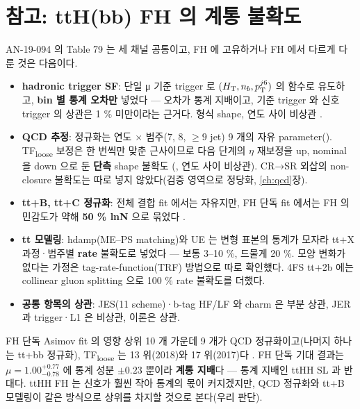 \section{참고: ttH(bb) FH 의 계통 불확도}\label{sec:syst-tth}

AN-19-094 의 Table 79 는 세 채널 공통이고, FH 에 고유하거나 FH 에서 다르게 다룬 것은 다음이다.
\begin{itemize}
\item \textbf{hadronic trigger SF}: 단일 μ 기준 trigger 로 $(H_{\mathrm{T}}, n_b, p_{\mathrm{T}}^{j6})$ 의 함수로 유도하고, \textbf{bin 별 통계 오차만} 넣었다 —
  오차가 통계 지배이고, 기준 trigger 와 신호 trigger 의 상관은 1 \% 미만이라는 근거다. 형식 shape, 연도 사이 비상관
  .
\item \textbf{QCD 추정}: 정규화는 연도 × 범주(7, 8, $\ge9$ jet) 9 개의 자유 parameter().
  TF\textsubscript{loose} 보정은 한 번씩만 맞춘 근사이므로 다음 단계의 $\eta$ 재보정을 up, nominal 을 down 으로 둔 \textbf{단측} shape 불확도
  (, 연도 사이 비상관). CR→SR 외삽의 non-closure
  불확도는 따로 넣지 않았다(검증 영역으로 정당화, \ref{ch:qcd}장).
\item \textbf{tt+B, tt+C 정규화}: 전체 결합 fit 에서는 자유지만, FH 단독 fit 에서는 FH 의 민감도가 약해 \textbf{50 \% lnN} 으로 묶었다
  .
\item \textbf{tt 모델링}: hdamp(ME–PS matching)와 UE 는 변형 표본의 통계가 모자라 tt+X 과정·범주별 \textbf{rate} 불확도로 넣었다 — 보통 3--10 \%, 드물게
  20 \%. 모양 변화가 없다는 가정은 tag-rate-function(TRF) 방법으로 따로 확인했다. 4FS tt+2b 에는 collinear gluon
  splitting 으로 100 \% rate 불확도를 더했다.
\item \textbf{공통 항목의 상관}: JES(11 scheme)·b-tag HF/LF 와 charm 은 부분 상관, JER 과 trigger·L1 은 비상관, 이론은 상관.
\end{itemize}
FH 단독 Asimov fit 의 영향 상위 10 개 가운데 9 개가 QCD 정규화이고(나머지 하나는 tt+bb 정규화), TF\textsubscript{loose} 는 13 위(2018)와 17 위(2017)다
. FH 단독 기대 결과는 $\mu=1.00^{+0.77}_{-0.78}$ 에 통계 성분 $\pm0.23$ 뿐이라
\textbf{계통 지배}다 — 통계 지배인 ttHH SL 과 반대다. ttHH FH 는 신호가 훨씬 작아 통계의 몫이 커지겠지만, QCD 정규화와 tt+B 모델링이 같은 방식으로
상위를 차지할 것으로 본다(우리 판단).

